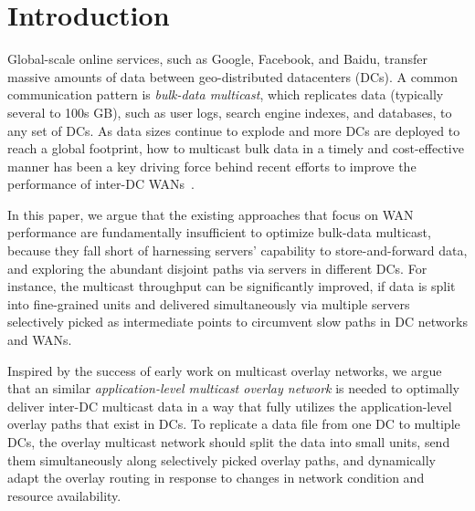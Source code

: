 \section{Introduction}

Global-scale online services, such as Google, Facebook, and 
Baidu, transfer massive amounts of data between geo-distributed 
datacenters (DCs). 
A common communication pattern is {\em bulk-data multicast}, 
which replicates data 
(typically several to 100s GB), such as user 
logs, search engine indexes, and databases, 
to any set of DCs. 
As data sizes continue to explode and more DCs are deployed to 
reach a global footprint, how to multicast bulk data in a timely 
and cost-effective manner has been a key driving force behind 
recent efforts to improve the performance of inter-DC 
WANs~\cite{b4,bwe,swan,??,??,??}.



In this paper, we argue that the existing approaches that focus 
on WAN performance are fundamentally insufficient to optimize 
bulk-data multicast, because they fall 
short of harnessing servers' capability to store-and-forward 
data, and exploring the abundant disjoint paths via servers 
in different DCs. 
For instance, the multicast throughput can be significantly 
improved, if data is split into fine-grained units and 
delivered simultaneously via multiple servers selectively picked 
as intermediate points to circumvent slow paths in DC
networks and WANs.


Inspired by the success of early work on multicast overlay 
networks, we argue that an similar 
{\em application-level multicast overlay network} 
is needed to optimally deliver inter-DC multicast data in
a way that fully utilizes the application-level overlay paths
that exist in DCs.
To replicate a data file from one DC to multiple DCs, 
the overlay multicast network should split the data into small 
units, send them simultaneously along selectively picked overlay 
paths, and dynamically adapt the overlay routing in response to 
changes in network condition and 
resource availability.


